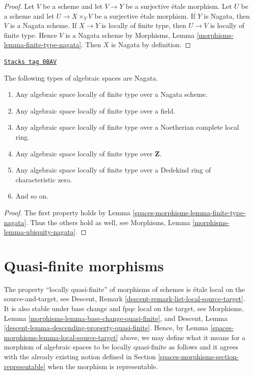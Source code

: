 \begin{proof}
Let $V$ be a scheme and let $V \to Y$ be a surjective \'etale morphism.
Let $U$ be a scheme and let $U \to X \times_Y V$ be a surjective \'etale
morphism. If $Y$ is Nagata, then $V$ is a Nagata scheme.
If $X \to Y$ is locally of finite type, then $U \to V$ is locally
of finite type. Hence $V$ is a Nagata scheme by
Morphisms, Lemma \ref{morphisms-lemma-finite-type-nagata}.
Then $X$ is Nagata by definition.
\end{proof}

\begin{lemma}
\label{spaces-morphisms-lemma-ubiquity-nagata}
\href{https://stacks.math.columbia.edu/tag/0BAV}{\texttt{Stacks tag 0BAV}}

The following types of algebraic spaces are Nagata.
\begin{enumerate}
\item Any algebraic space locally of finite type over a Nagata scheme.
\item Any algebraic space locally of finite type over a field.
\item Any algebraic space locally of finite type over a
Noetherian complete local ring.
\item Any algebraic space locally of finite type over $\mathbf{Z}$.
\item Any algebraic space locally of finite type over a Dedekind ring of
characteristic zero.
\item And so on.
\end{enumerate}
\end{lemma}

\begin{proof}
The first property holds by Lemma \ref{spaces-morphisms-lemma-finite-type-nagata}.
Thus the others hold as well, see
Morphisms, Lemma \ref{morphisms-lemma-ubiquity-nagata}.
\end{proof}

\section{Quasi-finite morphisms}
\label{spaces-morphisms-section-quasi-finite}
The property ``locally quasi-finite'' of morphisms of schemes is
\'etale local on the source-and-target, see
Descent, Remark \ref{descent-remark-list-local-source-target}.
It is also stable under base change and fpqc local on the target, see
Morphisms, Lemma \ref{morphisms-lemma-base-change-quasi-finite}, and
Descent, Lemma \ref{descent-lemma-descending-property-quasi-finite}.
Hence, by
Lemma \ref{spaces-morphisms-lemma-local-source-target}
above, we may define what it means for a morphism of algebraic spaces
to be locally quasi-finite as
follows and it agrees with the already existing notion defined in
Section \ref{spaces-morphisms-section-representable}
when the morphism is representable.

